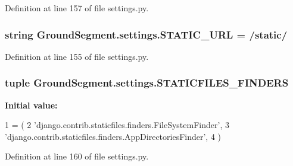 Definition at line 157 of file settings.\+py.

\hypertarget{namespace_ground_segment_1_1settings_ae91e0e33f45cae10b6f1f4aef7862e1a}{}
\subsubsection[{S\+T\+A\+T\+I\+C\+\_\+\+U\+R\+L}]{\setlength{\rightskip}{0pt plus 5cm}string Ground\+Segment.\+settings.\+S\+T\+A\+T\+I\+C\+\_\+\+U\+R\+L = \textquotesingle{}/static/\textquotesingle{}}\label{namespace_ground_segment_1_1settings_ae91e0e33f45cae10b6f1f4aef7862e1a}


Definition at line 155 of file settings.\+py.

\hypertarget{namespace_ground_segment_1_1settings_abf83e5e190e2a3cf3ae8d8bac305e750}{}
\subsubsection[{S\+T\+A\+T\+I\+C\+F\+I\+L\+E\+S\+\_\+\+F\+I\+N\+D\+E\+R\+S}]{\setlength{\rightskip}{0pt plus 5cm}tuple Ground\+Segment.\+settings.\+S\+T\+A\+T\+I\+C\+F\+I\+L\+E\+S\+\_\+\+F\+I\+N\+D\+E\+R\+S}\label{namespace_ground_segment_1_1settings_abf83e5e190e2a3cf3ae8d8bac305e750}
{\bfseries Initial value\+:}
\begin{DoxyCode}
1 = (
2     \textcolor{stringliteral}{'django.contrib.staticfiles.finders.FileSystemFinder'},
3     \textcolor{stringliteral}{'django.contrib.staticfiles.finders.AppDirectoriesFinder'},
4 )
\end{DoxyCode}


Definition at line 160 of file settings.\+py.

\hypertarget{namespace_ground_segment_1_1settings_aef52073a71704189e79714d515ba3de3}{}
